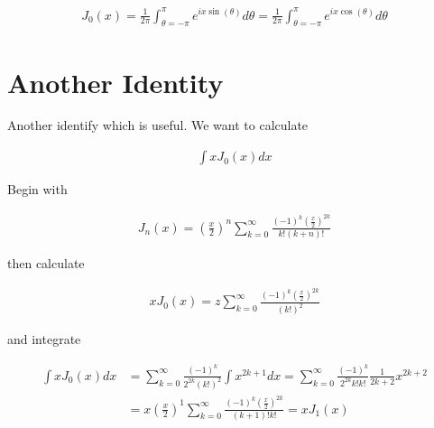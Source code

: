 \documentclass[12pt]{article}
\begin{document}
\begin{align}
J_0(x) = \frac{1}{2\pi} \int_{\theta = -\pi}^{\pi} e^{ix\sin(\theta)} d\theta = \frac{1}{2\pi} \int_{\theta = -\pi}^{\pi} e^{ix\cos(\theta)} d\theta
\end{align}

\section{Another Identity}

Another identify which is useful. We want to calculate

\begin{align}
\int x J_0(x) dx
\end{align}

Begin with

\begin{align}
J_n(x) = \left(\frac{x}{2}\right)^n\sum_{k=0}^{\infty} \frac{(-1)^k\left(\frac{x}{2}\right)^{2k}}{k!(k+n)!}
\end{align}

then calculate

\begin{align}
xJ_0(x) = z \sum_{k=0}^{\infty} \frac{(-1)^k\left(\frac{x}{2}\right)^{2k}}{(k!)^2}
\end{align}

and integrate

\begin{align}
\int xJ_0(x) dx &= \sum_{k=0}^{\infty} \frac{(-1)^k}{2^{2k} (k!)^2}\int x^{2k+1} dx = \sum_{k=0}^{\infty} \frac{(-1)^k}{2^{2k}k!k!} \frac{1}{2k+2} x^{2k+2}\\
&= x \left(\frac{x}{2}\right)^1\sum_{k=0}^{\infty} \frac{(-1)^k \left(\frac{x}{2}\right)^{2k}}{(k+1)!k!} = xJ_1(x)
\end{align}
\end{document}
